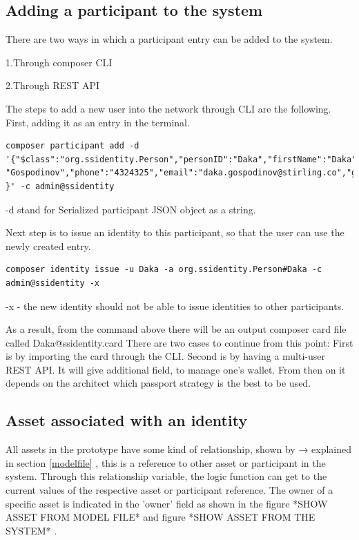 \documentclass[a4paper,11pt]{report}
\begin{document}
\subsection{Adding a participant to the system}
There are two ways in which a participant entry can be added to the system.

1.Through composer CLI 

2.Through REST API 
 

The steps to add a new user into the network through CLI are the following. First, adding it as an entry in the terminal. 
\begin{verbatim}
composer participant add -d '{"$class":"org.ssidentity.Person","personID":"Daka","firstName":"Daka","lastName": "Gospodinov","phone":"4324325","email":"daka.gospodinov@stirling.co","gender":"Male","age":23 }' -c admin@ssidentity
\end{verbatim}	

-d stand for Serialized participant JSON object as a string. 

Next step is to issue an identity to this participant, so that the user can use the newly created entry. 

\begin{verbatim}
composer identity issue -u Daka -a org.ssidentity.Person#Daka -c admin@ssidentity -x
\end{verbatim}
-x - the new identity should not be able to issue identities to other participants. 

As a result, from the command above there will be an output composer card file called Daka@ssidentity.card There are two cases to continue from this point: 
First is by importing the card through the CLI.
Second is by having a multi-user REST API. It will give additional field, to manage one's wallet. From then on it depends on the architect which passport strategy is the best to be used. 

\subsection{Asset associated with an identity}
All assets in the prototype have some kind of relationship, shown by →  explained in section \ref{modelfile} , this is a reference to other asset or participant in the system. Through this relationship variable, the logic function can get to the current values of the respective asset or participant reference. 
	The owner of a specific asset is indicated in the 'owner' field as shown in the figure *SHOW ASSET FROM MODEL FILE* and figure *SHOW ASSET FROM THE SYSTEM* . 
\end{document}
